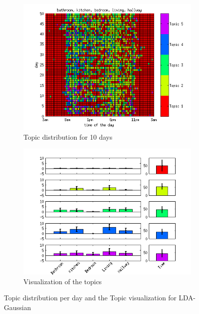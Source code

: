 \documentclass[11pt,a4paper]{article}
\begin{document}
\begin{figure}[h!]
 \centering
 \begin{subfigure}[b]{0.45\linewidth}
  \centering
  \includegraphics[width=\textwidth]{Pictures/TopDayTS96k5Gaus.png}
  \caption{Topic distribution for 10 days}
 \end{subfigure}
 \begin{subfigure}[b]{0.45\linewidth}
  \centering
  \includegraphics[width=\textwidth]{Pictures/TopVisuTS96k5Gaus.png}
  \caption{Visualization of the topics}
  \label{fig:GausTopVisu96}
 \end{subfigure}
 \caption{Topic distribution per day and the Topic visualization for LDA-Gaussian}
 \label{fig:Gaus96}
\end{figure}
\end{document}

